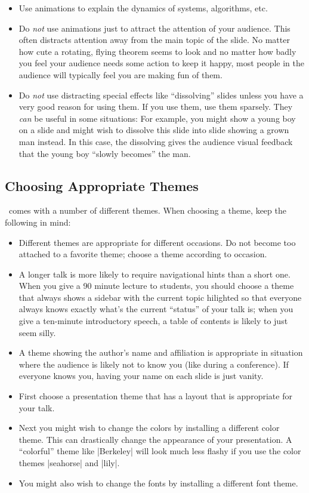 \begin{itemize}
\item
  Use animations to explain the dynamics of systems, algorithms, etc.
\item
  Do \emph{not} use animations just to attract the attention of your
  audience. This often distracts attention away from the main topic of the
  slide. No matter how cute a rotating,
  flying theorem seems to look and no matter how badly you feel your
  audience needs some action to keep it happy, most people in the
  audience will typically feel you are making fun of them. 
\item
  Do \emph{not} use distracting special effects like ``dissolving''
  slides unless you have a very good reason for using them. If you use
  them, use them sparsely. 
  They \emph{can} be useful in some situations: For example, you might
  show a   young boy on a slide and might wish to dissolve this slide
  into   slide showing a grown man instead. In this case, the
  dissolving  gives the audience visual feedback that the young boy
  ``slowly becomes'' the man. 
\end{itemize}




\subsection{Choosing Appropriate Themes}

\beamer\ comes with a number of different themes. When choosing a
theme, keep the following in mind:

\begin{itemize}
\item
  Different themes are appropriate for different occasions. Do not
  become too attached to a favorite theme; choose a 
  theme according to occasion.
\item
  A longer talk is more likely to require navigational hints
  than a short one. When you give a 90 minute lecture to students, you
  should choose a theme that always shows a sidebar with the current
  topic hilighted so that everyone always knows exactly what's the
  current ``status'' of your talk is; when you give a ten-minute
  introductory speech, a table of contents is likely to just seem
  silly.
\item
  A theme showing the author's name and affiliation is appropriate in
  situation where the audience is likely not to know you (like during
  a conference). If everyone knows you, having your name on each slide
  is just vanity. 
\item
  First choose a presentation theme that has a layout that is
  appropriate for your talk.
\item
  Next you might wish to change the colors by installing a different
  color theme. This can drastically change the appearance of your
  presentation. A ``colorful'' theme like |Berkeley| will look much
  less flashy if you use the color themes |seahorse| and |lily|. 
\item
  You might also wish to change the fonts by installing a different
  font theme.
\end{itemize}



